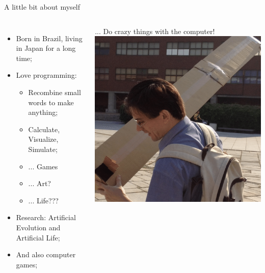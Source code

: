 \documentclass[aspectratio=169]{beamer}
\begin{document}
\begin{frame}{A little bit about myself}
  \begin{columns}
    \begin{itemize}
      \item Born in Brazil, living in Japan for a long time;
      \item Love programming:
      \begin{itemize}
        \item Recombine small words to make anything;
        \item Calculate, Visualize, Simulate;
        \item ... Games
        \item ... Art?
        \item ... Life???
      \end{itemize}
      \item Research: Artificial Evolution and Artificial Life;
      \item And also computer games;
    \end{itemize}
    \vfill
    \hfill ... Do crazy things with the computer!
    \includegraphics[width=.9\textwidth]{img/Claus_Eclipse}
  \end{columns}
\end{frame}
\end{document}
